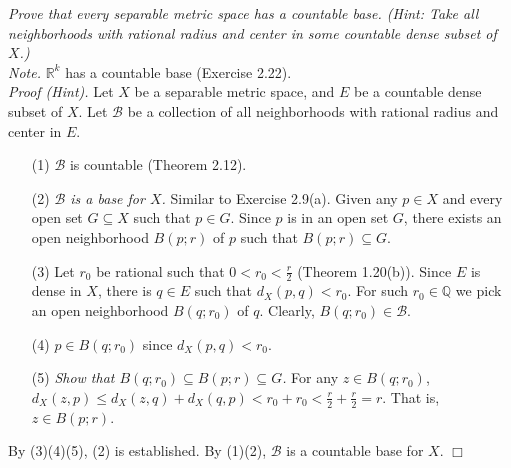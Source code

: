 \documentclass{article}
\begin{document}
\emph{Prove that every separable metric space has a countable base.
(Hint: Take all neighborhoods with rational radius and center
in some countable dense subset of $X$.)} \\

\emph{Note.}
$\mathbb{R}^k$ has a countable base (Exercise 2.22). \\

\emph{Proof (Hint).}
Let $X$ be a separable metric space,
and $E$ be a countable dense subset of $X$.
Let $\mathscr{B}$ be a collection of
all neighborhoods with rational radius and center in $E$.
\begin{enumerate}
\item[(1)]
$\mathscr{B}$ is countable (Theorem 2.12).
\item[(2)]
\emph{$\mathscr{B}$ is a base for $X$.}
Similar to Exercise 2.9(a).
Given any $p \in X$ and every open set $G \subseteq X$ such that
$p \in G$.
Since $p$ is in an open set $G$,
there exists an open neighborhood $B(p;r)$ of $p$ such that $B(p;r) \subseteq G$.
\item[(3)]
Let $r_0$ be rational such that $0 < r_0 < \frac{r}{2}$ (Theorem 1.20(b)).
Since $E$ is dense in $X$, there is $q \in E$ such that $d_X(p,q) < r_0$.
For such $r_0 \in \mathbb{Q}$ we pick an open neighborhood $B(q;r_0)$ of $q$.
Clearly, $B(q;r_0) \in \mathscr{B}$.
\item[(4)]
$p \in B(q;r_0)$ since $d_X(p,q) < r_0$.
\item[(5)]
\emph{Show that $B(q;r_0) \subseteq B(p;r) \subseteq G$.}
For any $z \in B(q;r_0)$, $d_X(z,p) \leq d_X(z,q)+ d_X(q,p) < r_0 + r_0
< \frac{r}{2} + \frac{r}{2} = r$.
That is, $z \in B(p;r)$.
\end{enumerate}
By (3)(4)(5), (2) is established.
By (1)(2), $\mathscr{B}$ is a countable base for $X$.
$\Box$ \\
\end{document}
